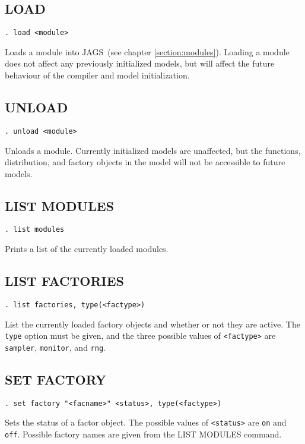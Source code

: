 \documentclass[11pt, a4paper, titlepage]{report}
\newcommand{\JAGS}{\textsf{JAGS}}
\begin{document}
\subsection{LOAD}
\label{load}
\begin{verbatim}
. load <module>
\end{verbatim}
Loads a module into \JAGS\ (see chapter \ref{section:modules}). Loading
a module does not affect any previously initialized models, but will
affect the future behaviour of the compiler and model initialization.

\subsection{UNLOAD}
\label{unload}
\begin{verbatim}
. unload <module>
\end{verbatim}
Unloads a module. Currently initialized models are unaffected, but
the functions, distribution, and factory objects in the model will not
be accessible to future models.

\subsection{LIST MODULES}
\label{list:modules}
\begin{verbatim}
. list modules
\end{verbatim}
Prints a list of the currently loaded modules.

\subsection{LIST FACTORIES}
\label{list:factories}
\begin{verbatim}
. list factories, type(<factype>)
\end{verbatim}
List the currently loaded factory objects and whether or not they are
active.  The \verb+type+ option must be given, and the three possible values
of \verb+<factype>+ are \verb+sampler+, \verb+monitor+, and \verb+rng+.

\subsection{SET FACTORY}
\label{set:factory}
\begin{verbatim}
. set factory "<facname>" <status>, type(<factype>)
\end{verbatim}
Sets the status of a factor object. The possible values of \verb+<status>+
are \verb+on+ and \verb+off+. Possible factory names are given from the
LIST MODULES command.
\end{document}

